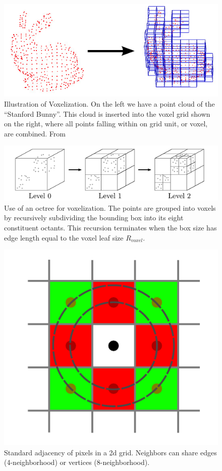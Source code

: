 \begin{figure}[t]
\begin{center}
\includegraphics[width=0.8\linewidth]{figures/WorldModel/stanford_bunny.png}
\end{center}
   \caption[Example of Voxelization]{Illustration of Voxelization. On the left we have a point cloud of the ``Stanford Bunny''. This cloud is inserted into the voxel grid shown on the right, where all points falling within on grid unit, or voxel, are combined. From \cite{PCLWebsite}}
\label{fig:stanford_bunny}
\end{figure}

\begin{figure}[t]
\begin{center}
\includegraphics[width=\linewidth]{figures/WorldModel/voxel_grid_octree.png}
\end{center}
   \caption[Octree Voxelization]{Use of an octree for voxelization. The points are grouped into voxels by recursively subdividing the bounding box into its eight constituent octants. This recursion terminates when the box size has edge length equal to the voxel leaf size ${R}_{voxel}$.}
\label{fig:stanford_bunny}
\end{figure}

\begin{figure}[t]
\begin{center}
\includegraphics[width=0.5\linewidth]{figures/WorldModel/2d_nearest_neigh.png}
\end{center}
   \caption[Adjacency in a 2d Grid]{Standard adjacency of pixels in a 2d grid. Neighbors can share edges (4-neighborhood) or vertices (8-neighborhood).}
\label{fig:stanford_bunny}
\end{figure}

